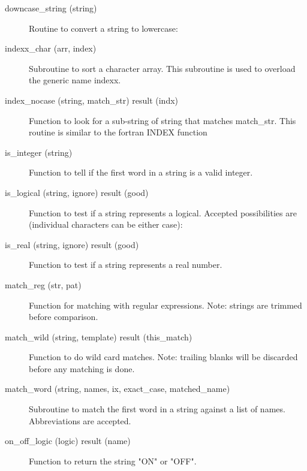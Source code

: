 \begin{description}

\label{r:downcase.string}
\item[downcase_string (string)] \Newline 
Routine to convert a string to lowercase:

\label{r:indexx.char}
\item[indexx_char (arr, index)] \Newline 
Subroutine to sort a character array.
This subroutine is used to overload the generic name indexx.

\label{r:index.nocase}
\item[index_nocase (string, match_str) result (indx)] \Newline 
Function to look for a sub-string of string that matches match_str.
This routine is similar to the fortran INDEX function

\label{r:is.integer}
\item[is_integer (string)] \Newline 
Function to tell if the first word in a string is a valid integer.

\label{r:is.logical}
\item[is_logical (string, ignore) result (good)] \Newline 
Function to test if a string represents a logical.
Accepted possibilities are (individual characters can be either case):

\label{r:is.real}
\item[is_real (string, ignore) result (good)] \Newline 
Function to test if a string represents a real number.

\label{r:match.reg}
\item[match_reg (str, pat)] \Newline 
Function for matching with regular expressions.
Note: strings are trimmed before comparison.

\label{r:match.wild}
\item[match_wild (string, template) result (this_match)] \Newline 
Function to do wild card matches. Note: trailing blanks will be discarded
before any matching is done.

\label{r:match.word}
\item[match_word (string, names, ix, exact_case, matched_name)] \Newline 
Subroutine to match the first word in a string against a list of names.
Abbreviations are accepted.  

\label{r:on.off.logic}
\item[on_off_logic (logic) result (name)] \Newline 
Function to return the string "ON" or "OFF".


\end{description}
